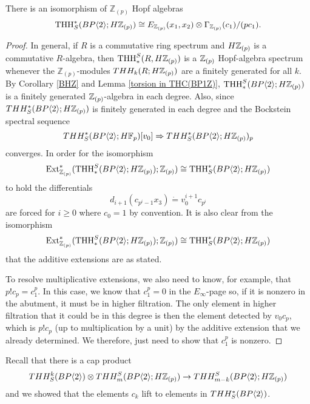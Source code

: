 \begin{lem}
There is an isomorphism of $\mathbb{Z}_{(p)}$ Hopf algebras
\[ \operatorname{THH}_S^*(BP\langle 2 \rangle;H\mathbb{Z}_{(p)})\cong E_{\mathbb{Z}_{(p)}}(x_1,x_2)\otimes \Gamma_{\mathbb{Z}_{(p)}}(c_1)/(pc_1).\]
\end{lem}
\begin{proof}
In general, if $R$ is a commutative ring spectrum and $H\mathbb{Z}_{(p)}$ is a commutative $R$-algebra, then $\operatorname{THH}_*^S(R,H\mathbb{Z}_{(p)})$ is a $\mathbb{Z}_{(p)}$ Hopf-algebra spectrum whenever the $\mathbb{Z}_{(p)}$-modules $THH_k(R;H\mathbb{Z}_{(p)})$ are a finitely generated for all $k$. By Corollary \ref{BHZ} and Lemma \ref{torsion in THC(BP1Z)}, $\operatorname{THH}_*^S(BP\langle 2 \rangle;H\mathbb{Z}_{(p)})$ is a finitely generated $\mathbb{Z}_{(p)}$-algebra in each degree. Also, since $THH_S^*(BP\langle 2 \rangle;H\mathbb{Z}_{(p)})$ is finitely generated in each degree and the Bockstein spectral sequence 
\[ THH_S^*(BP\langle 2 \rangle;H\mathbb{F}_p)[v_0]\Rightarrow THH_S^*(BP\langle 2 \rangle;H\mathbb{Z}_{(p)})_p\]
converges. %
In order for the isomorphism 
\[ \operatorname{Ext}_{\mathbb{Z}_{(p)}}^*( \operatorname{THH}_*^S(BP\langle 2 \rangle;H\mathbb{Z}_{(p)});\mathbb{Z}_{(p)}) \cong \operatorname{THH}_S^*(BP\langle 2 \rangle;H\mathbb{Z}_{(p)})\]  
to hold the differentials
\[ d_{i+1}(c_{p^{i}-1}x_3) \dot{=} v_0^{i+1}c_{p^i}\]
are forced for $i\ge 0$ where $c_0=1$ by convention. It is also clear from the isomorphism 
\[ \operatorname{Ext}_{\mathbb{Z}_{(p)}}^*( \operatorname{THH}_*^S(BP\langle 2 \rangle;H\mathbb{Z}_{(p)});\mathbb{Z}_{(p)}) \cong \operatorname{THH}_S^*(BP\langle 2 \rangle;H\mathbb{Z}_{(p)})\] 
that the additive extensions are as stated. 

To resolve multiplicative extensions, we also need to know, for example, that $p!c_p=c_1^p$. In this case, we know that $c_1^p=0$ in the $E_{\infty}$-page so, if it is nonzero in the abutment, it must be in higher filtration. The only element in higher filtration that it could be in this degree is then the element detected by $v_0c_p$, which is $p!c_p$ (up to multiplication by a unit) by the additive extension that we already determined. We therefore, just need to show that $c_1^p$ is nonzero. 
\end{proof}
Recall that there is a cap product 
\[ THH_S^k(BP\langle 2 \rangle)\otimes THH^S_m(BP\langle 2 \rangle;H\mathbb{Z}_{(p)})\rightarrow THH^S_{m-k}(BP\langle 2 \rangle;H\mathbb{Z}_{(p)})\]
and we showed that the elements $c_k$ lift to elements in $THH_S^*(BP\langle 2 \rangle)$. 

